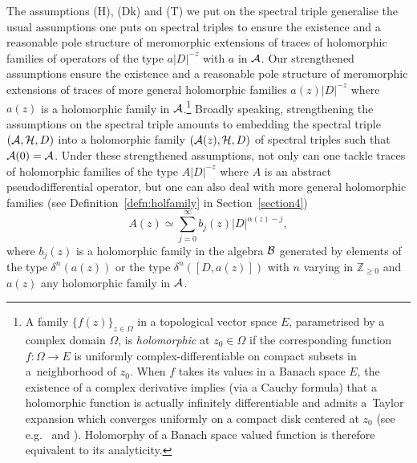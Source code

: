 \documentclass[pdftex]{sigma}
\def \Z {\mathbb Z}
\numberwithin{equation}{section}
\begin{document}
 The assumptions (H), (Dk) and (T) we put on the spectral triple generalise
the usual assumptions one puts on spectral triples to ensure the existence and a
reasonable pole structure of
meromorphic extensions of traces of holomorphic families of  operators of the
type $a \vert
D\vert^{-z}$ with $a$ in ${\cal A}$. Our strengthened assumptions ensure
the existence and a reasonable pole structure of meromorphic extensions of  traces of  more general holomorphic families
$a(z)   \vert D\vert^{-z}$ where $a(z)$ is a holomorphic family in ${\cal
  A}$.\footnote{\label{footnote:holfam}A family $\{f(z)\}_{z\in \Omega}$  in a topological vector space $E$,
 parametrised by a complex domain $\Omega$,  is {\it  holomorphic} at
$z_0\in \Omega$ if
the corresponding function $f:\Omega\to E$  is   uniformly
complex-dif\/ferentiable on compact subsets in a~neighborhood of $z_0$.  When $f$
takes its values in a Banach space $E$,    the existence of a complex
derivative  implies (via  a  Cauchy formula) that a holomorphic
function is actually inf\/initely dif\/ferentiable and admits a~Taylor expansion which converges uniformly  on a  compact disk centered at
  $z_0$ (see e.g.~\cite[Theorem~8.1.7]{Hig}   and \cite[Section~XV.5.1]{DS}).
   Holomorphy of a Banach space valued function is therefore equivalent to
   its analyticity.}  Broadly speaking, strengthening the assumptions on the spectral triple
amounts to embedding the spectral triple $\left({\cal A}, {\cal
    H}, D\right)$ into a holomorphic family $\left({\cal A}(z), {\cal
    H}, D\right)$ of spectral triples such that ${\cal A}(0)={\cal A}$.  Under these strengthened  assumptions,   not only can one  tackle
traces of holomorphic families of the type  $A
\vert D\vert^{-z}$ where $A$ is an abstract pseudodif\/ferential operator, but
one can also deal with
more general holomorphic families (see Def\/inition~\ref{defn:holfamily} in
Section~\ref{section4})
\[
A(z)\simeq\sum_{j=0}^\infty
b_j(z) \vert D\vert^{\alpha(z)-j},
\]
 where $b_j(z)$ is a holomorphic family in
the algebra ${\cal B}$  generated by  elements  of the type $\delta^n(a(z))$ or the type $ \delta^n\left([D,
  a(z)]\right)$ with $  n$ varying in $ \Z_{\geq 0}$ and  $a(z)$ any holomorphic family in ${\cal
  A} $.
\end{document}
